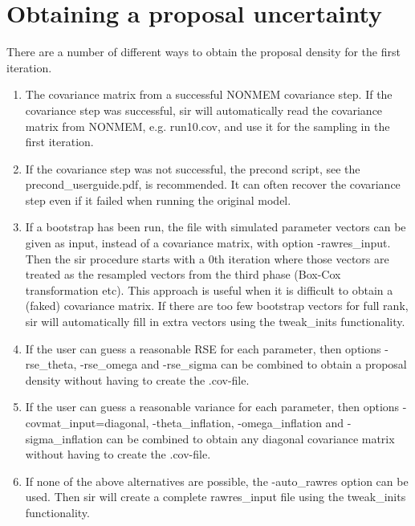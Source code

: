 \section{Obtaining a proposal uncertainty}
There are a number of different ways to obtain the proposal density for the first iteration.
\begin{enumerate}
\item The covariance matrix from a successful NONMEM covariance step. If the covariance step was successful, sir will automatically
read the covariance matrix from NONMEM, e.g. run10.cov,  and use it for the sampling in the first iteration.
\item If the covariance step was not successful, the precond script, see the precond\_userguide.pdf, 
is recommended. It can often recover the covariance step even if it failed when running the original model.
\item If a bootstrap has been run, the file with simulated parameter vectors can be given as input, instead of 
a covariance matrix, with option -rawres\_input. 
Then the sir procedure starts with a 0th iteration where those vectors are treated as the resampled 
vectors from the third phase (Box-Cox transformation etc). This approach is useful when it is difficult to obtain a (faked) covariance matrix. 
If there are too few bootstrap vectors for full rank, sir will automatically fill in extra vectors using the
tweak\_inits functionality.
\item If the user can guess a reasonable RSE for each parameter, then 
options -rse\_theta, -rse\_omega and -rse\_sigma can be combined
to obtain a proposal density without having to create the .cov-file.
\item If the user can guess a reasonable variance for each parameter, then 
options -covmat\_input=diagonal,
-theta\_inflation, -omega\_inflation and -sigma\_inflation can be combined to obtain any diagonal covariance matrix
without having to create the .cov-file.
\item If none of the above alternatives are possible, the -auto\_rawres option can be used.
Then sir will create a complete rawres\_input file using the tweak\_inits functionality.
\end{enumerate}


